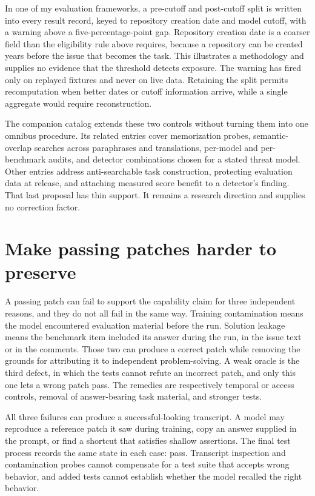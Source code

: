 In one of my evaluation frameworks, a pre-cutoff and post-cutoff split is written into every result record, keyed to repository creation date and model cutoff, with a warning above a five-percentage-point gap. Repository creation date is a coarser field than the eligibility rule above requires, because a repository can be created years before the issue that becomes the task. This illustrates a methodology and supplies no evidence that the threshold detects exposure. The warning has fired only on replayed fixtures and never on live data. Retaining the split permits recomputation when better dates or cutoff information arrive, while a single aggregate would require reconstruction.

The companion catalog extends these two controls without turning them into one omnibus procedure. Its related entries cover memorization probes, semantic-overlap searches across paraphrases and translations, per-model and per-benchmark audits, and detector combinations chosen for a stated threat model. Other entries address anti-searchable task construction, protecting evaluation data at release, and attaching measured score benefit to a detector's finding. That last proposal has thin support. It remains a research direction and supplies no correction factor.

\hypertarget{make-passing-patches-harder-to-preserve}{%
\section{Make passing patches harder to preserve}\label{make-passing-patches-harder-to-preserve}}

A passing patch can fail to support the capability claim for three independent reasons, and they do not all fail in the same way. Training contamination means the model encountered evaluation material before the run. Solution leakage means the benchmark item included its answer during the run, in the issue text or in the comments. Those two can produce a correct patch while removing the grounds for attributing it to independent problem-solving. A weak oracle is the third defect, in which the tests cannot refute an incorrect patch, and only this one lets a wrong patch pass. The remedies are respectively temporal or access controls, removal of answer-bearing task material, and stronger tests.

All three failures can produce a successful-looking transcript. A model may reproduce a reference patch it saw during training, copy an answer supplied in the prompt, or find a shortcut that satisfies shallow assertions. The final test process records the same state in each case: pass. Transcript inspection and contamination probes cannot compensate for a test suite that accepts wrong behavior, and added tests cannot establish whether the model recalled the right behavior.

